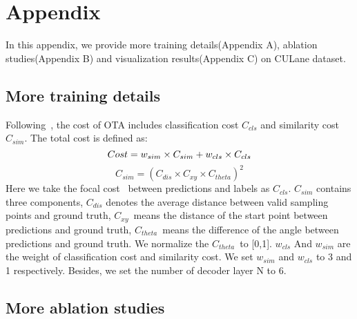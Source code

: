 \documentclass{bmvc2k}
\begin{document}
\section*{Appendix}

In this appendix, we provide more training details(Appendix A), 
ablation studies(Appendix B) and visualization results(Appendix C) on CULane dataset.

\renewcommand{\thesubsection}{\Alph{subsection}}
\subsection{More training details}

Following~\cite{zheng2022clrnet}, the cost of OTA includes classification cost $C_{cls}$ 
and similarity cost $C_{sim}$. The total cost is defined as:
\begin{equation}\label{eqn-15} 
   Cost=w_{sim}\times C_{sim}+w_{cls}\times C_{cls}
   \vspace{-0.5cm}
 \end{equation}
 \begin{equation}\label{eqn-16} 
   C_{sim}={(C_{dis}\times C_{xy}\times C_{theta})}^2
 \end{equation}
 Here we take the focal cost~\cite{lin2017focal} between predictions and labels as $C_{cls}$. $C_{sim}$ contains three components, $C_{dis}$ 
 denotes the average distance between valid sampling points and ground truth, $C_{xy}$\ means the distance of the 
 start point between predictions and ground  truth, $C_{theta}$\ means the difference of the angle between predictions 
 and ground truth. We normalize the $C_{theta}$\ to [0,1]. $w_{cls}$ And $w_{sim}$ are the weight of classification cost 
 and similarity cost. We set $w_{sim}$ and $w_{cls}$ to 3 and 1 respectively. Besides, we set the number of decoder layer N to 6.

\subsection{More ablation studies}
\end{document}
